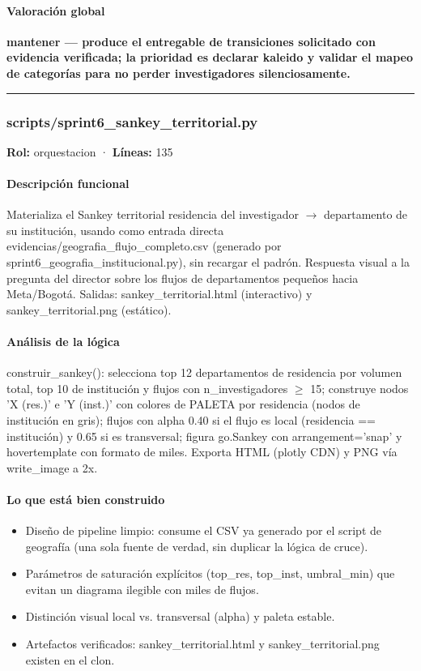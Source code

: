 \paragraph{Valoración global}
\textbf{mantener --- produce el entregable de transiciones solicitado con evidencia verificada; la prioridad es declarar kaleido y validar el mapeo de categorías para no perder investigadores silenciosamente.}

\medskip
\hrule

\subsubsection{scripts/sprint6\_sankey\_territorial.py}
\textbf{Rol:} orquestacion · \textbf{Líneas:} 135

\paragraph{Descripción funcional}
Materializa el Sankey territorial residencia del investigador $\rightarrow$ departamento de su institución, usando como entrada directa evidencias/geografia\_flujo\_completo.csv (generado por sprint6\_geografia\_institucional.py), sin recargar el padrón. Respuesta visual a la pregunta del director sobre los flujos de departamentos pequeños hacia Meta/Bogotá. Salidas: sankey\_territorial.html (interactivo) y sankey\_territorial.png (estático).

\paragraph{Análisis de la lógica}
construir\_sankey(): selecciona top 12 departamentos de residencia por volumen total, top 10 de institución y flujos con n\_investigadores $\geq$ 15; construye nodos 'X (res.)' e 'Y (inst.)' con colores de PALETA por residencia (nodos de institución en gris); flujos con alpha 0.40 si el flujo es local (residencia == institución) y 0.65 si es transversal; figura go.Sankey con arrangement='snap' y hovertemplate con formato de miles. Exporta HTML (plotly CDN) y PNG vía write\_image a 2x.

\paragraph{Lo que está bien construido}
\begin{itemize}
  \item Diseño de pipeline limpio: consume el CSV ya generado por el script de geografía (una sola fuente de verdad, sin duplicar la lógica de cruce).
  \item Parámetros de saturación explícitos (top\_res, top\_inst, umbral\_min) que evitan un diagrama ilegible con miles de flujos.
  \item Distinción visual local vs. transversal (alpha) y paleta estable.
  \item Artefactos verificados: sankey\_territorial.html y sankey\_territorial.png existen en el clon.
\end{itemize}

